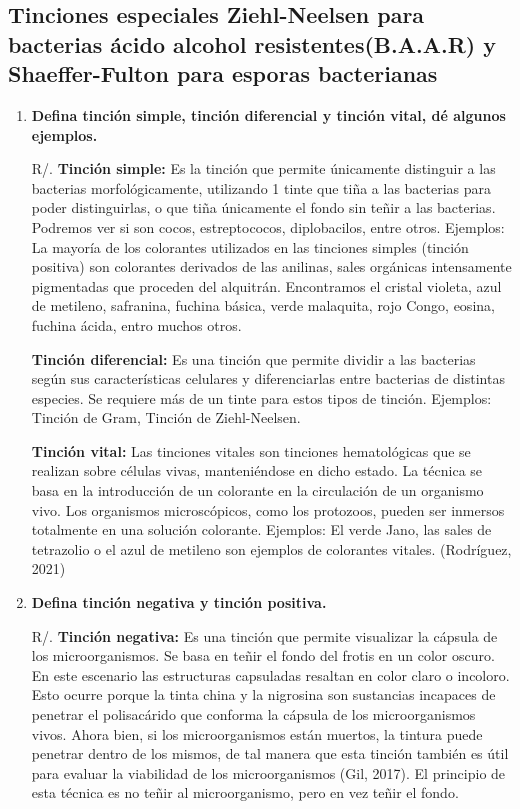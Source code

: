 \documentclass[journal,transmag]{IEEEtran}
\begin{document}
\subsection{\textbf{Tinciones especiales Ziehl-Neelsen para bacterias ácido alcohol resistentes(B.A.A.R) y Shaeffer-Fulton para esporas bacterianas }}
	
	\begin{enumerate}
	\item \textbf{Defina tinción simple, tinción diferencial y tinción vital, dé algunos ejemplos.}
	
	R/. \textbf{Tinción simple:} Es la tinción que permite únicamente distinguir a las bacterias morfológicamente, utilizando 1 tinte que tiña a las bacterias para poder distinguirlas, o que tiña únicamente el fondo sin teñir a las bacterias. Podremos ver si son cocos, estreptococos, diplobacilos, entre otros. Ejemplos: La mayoría de los colorantes utilizados en las tinciones simples (tinción positiva) son colorantes derivados de las anilinas, sales orgánicas intensamente pigmentadas que proceden del alquitrán. Encontramos el cristal violeta, azul de metileno, safranina, fuchina básica, verde malaquita, rojo Congo, eosina, fuchina ácida, entro muchos otros.

\textbf{Tinción diferencial:}  Es una tinción que permite dividir a las bacterias según sus características celulares y diferenciarlas entre bacterias de distintas especies. Se requiere más de un tinte para estos tipos de tinción. Ejemplos: Tinción de Gram, Tinción de Ziehl-Neelsen.

\textbf{Tinción vital:} Las tinciones vitales son tinciones hematológicas que se realizan sobre células vivas, manteniéndose en dicho estado. La técnica se basa en la introducción de un colorante en la circulación de un organismo vivo. Los organismos microscópicos, como los protozoos, pueden ser inmersos totalmente en una solución colorante. Ejemplos:  El verde Jano, las sales de tetrazolio o el azul de metileno son ejemplos de colorantes vitales. (Rodríguez, 2021)

	
	\item \textbf{Defina tinción negativa y tinción positiva. }
	
	R/. \textbf{Tinción negativa:} Es una tinción que permite visualizar la cápsula de los microorganismos. Se basa en teñir el fondo del frotis en un color oscuro. En este escenario las estructuras capsuladas resaltan en color claro o incoloro. Esto ocurre porque la tinta china y la nigrosina son sustancias incapaces de penetrar el polisacárido que conforma la cápsula de los microorganismos vivos. Ahora bien, si los microorganismos están muertos, la tintura puede penetrar dentro de los mismos, de tal manera que esta tinción también es útil para evaluar la viabilidad de los microorganismos (Gil, 2017). El principio de esta técnica es no teñir al microorganismo, pero en vez teñir el fondo.
	

\end{enumerate}
\end{document}
